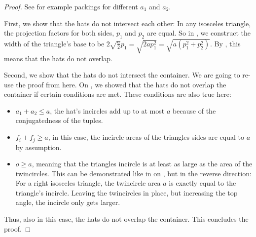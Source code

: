 \documentclass[a4paper,style=print,bibliography=totoc,nexus,lnum,extramargin]{tubsbook}
\begin{document}
\begin{proof}
    See  for example packings for different $a_1$ and $a_2$.

    First, we show that the hats do not intersect each other: In any isosceles triangle, the projection factors for both sides, $p_1$ and $p_2$ are equal. So in , we construct the width of the triangle's base to be $2\sqrt{\frac{a}{2}}p_1 = \sqrt{2ap_1^2} = \sqrt{a(p_1^2+p_2^2)}$. By , this means that the hats do not overlap.


    Second, we show that the hats do not intersect the container. We are going to re-use the proof from  here. On , we showed that the hats do not overlap the container if certain conditions are met. These conditions are also true here:

    \begin{itemize}
        \item $a_1 + a_2 \le a$, the hat's incircles add up to at most $a$ because of the conjugatedness of the tuples.
        \item $f_i + f_j \ge a$, in this case, the incircle-areas of the triangles sides are equal to $a$ by assumption.
        \item $o \ge a$, meaning that the triangles incircle is at least as large as the area of the twincircles. This can be demonstrated like in  on , but in the reverse direction: For a right isosceles triangle, the twincircle area $a$ is exactly equal to the triangle's incircle. Leaving the twincircles in place, but increasing the top angle, the incircle only gets larger.
    \end{itemize}

    Thus, also in this case, the hats do not overlap the container. This concludes the proof.
\end{proof}
\end{document}
